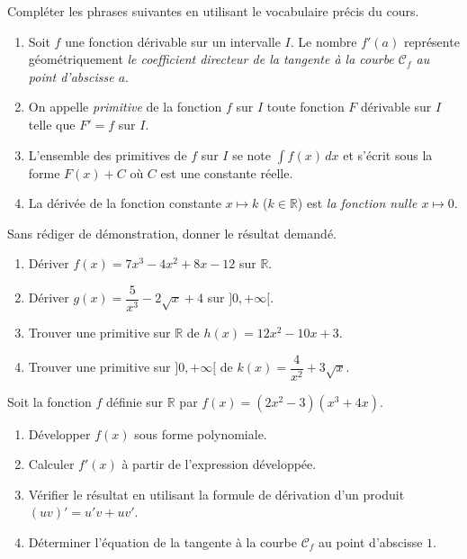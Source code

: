 \documentclass[11pt]{article}
\newcounter{popsec}
\newcounter{popsub}
\newcommand{\courssub}[1]{%
  \stepcounter{popsub}%
  \par\vspace{9pt}\noindent{\popxbold\fontsize{11.5}{13}\selectfont\color{popink}{\color{poporange}\thepopsec.\thepopsub}\hspace{6pt}#1}\par\nopagebreak\vspace{4pt}
}
\begin{document}
\begin{exercice}
Compléter les phrases suivantes en utilisant le vocabulaire précis du cours.
\begin{enumerate}
    \item Soit $f$ une fonction dérivable sur un intervalle $I$. Le nombre $f'(a)$ représente géométriquement \emph{le coefficient directeur de la tangente à la courbe $\mathcal{C}_f$ au point d'abscisse $a$}.
    \item On appelle \emph{primitive} de la fonction $f$ sur $I$ toute fonction $F$ dérivable sur $I$ telle que $F' = f$ sur $I$.
    \item L'ensemble des primitives de $f$ sur $I$ se note \emph{$\int f(x)\,dx$} et s'écrit sous la forme \emph{$F(x) + C$} où $C$ est une constante réelle.
    \item La dérivée de la fonction constante $x \mapsto k$ ($k \in \mathbb{R}$) est \emph{la fonction nulle $x \mapsto 0$}.
\end{enumerate}
\end{exercice}

\begin{exercice}
Sans rédiger de démonstration, donner le résultat demandé.
\begin{enumerate}
    \item Dériver $f(x) = 7x^3 - 4x^2 + 8x - 12$ sur $\mathbb{R}$.
    \item Dériver $g(x) = \dfrac{5}{x^3} - 2\sqrt{x} + 4$ sur $]0,+\infty[$.
    \item Trouver une primitive sur $\mathbb{R}$ de $h(x) = 12x^2 - 10x + 3$.
    \item Trouver une primitive sur $]0,+\infty[$ de $k(x) = \dfrac{4}{x^2} + 3\sqrt{x}$.
\end{enumerate}
\end{exercice}

\courssub{Je m'entraîne}

\begin{exercice}
Soit la fonction $f$ définie sur $\mathbb{R}$ par $f(x) = (2x^2 - 3)(x^3 + 4x)$.
\begin{enumerate}
    \item Développer $f(x)$ sous forme polynomiale.
    \item Calculer $f'(x)$ à partir de l'expression développée.
    \item Vérifier le résultat en utilisant la formule de dérivation d'un produit $(uv)' = u'v + uv'$.
    \item Déterminer l'équation de la tangente à la courbe $\mathcal{C}_f$ au point d'abscisse $1$.
\end{enumerate}
\end{exercice}
\end{document}

